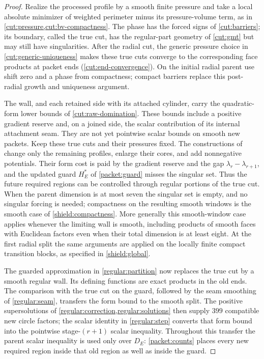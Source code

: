 \documentclass[11pt]{article}
\numberwithin{equation}{section}
\theoremstyle{definition}
\theoremstyle{remark}
\begin{document}
\begin{proof}
Realize the processed profile by a smooth finite pressure and take a
local absolute minimizer of weighted perimeter minus its pressure-volume
term, as in \cref{cut:pressure,cut:bv-compactness}. The phase has the
forced signs of \cref{cut:barriers}; its boundary, called the true cut,
has the regular-part geometry of \cref{cut:gmt} but may still have
singularities. After the
radial cut, the generic pressure choice in
\cref{cut:generic-uniqueness} makes these true cuts converge to the
corresponding face products at packet ends
(\cref{cut:end-convergence}). On the initial radial parent use shift
zero and a phase from compactness; compact barriers replace this
post-radial growth and uniqueness argument.

The wall, and each retained side with its attached cylinder,
carry the quadratic-form lower bounds of \cref{cut:raw-domination}.
These bounds include a positive gradient reserve and, on a joined
side, the scalar contribution of its internal attachment seam.
They are not yet pointwise scalar bounds on smooth new packets.
Keep these true cuts and their pressures fixed. The constructions of
 change only the remaining
profiles, enlarge their cores, and add nonnegative potentials. Their
form cost is paid by the gradient reserve and the gap
$\lambda_r-\lambda_{r+1}$, and the updated guard $H_E^*$ of
\eqref{packet:guard} misses the singular set. Thus the future required
regions can be controlled through regular portions of the true cut.
When the parent dimension is at most seven the
singular set is empty, and no singular forcing is needed; compactness on
the resulting smooth windows is the smooth case of
\cref{shield:compactness}. More generally this smooth-window case applies
whenever the limiting wall is smooth, including products of smooth faces
with Euclidean factors even when their total dimension is at least eight.
At the first radial split the same arguments
are applied on the locally finite compact transition blocks, as specified
in \cref{shield:global}.

The guarded approximation in \cref{regular:partition} now replaces
the true cut by a smooth regular wall. Its defining functions are
exact products in the old ends. The comparison with the true cut on
the guard, followed by the seam smoothing of \cref{regular:seam},
transfers the form bound to the smooth split. The positive
supersolutions of \cref{regular:correction,regular:solutions}
then supply $399$ compatible new circle factors; the scalar identity
in \cref{regular:step} converts that form bound into the pointwise
stage-$(r+1)$ scalar inequality. Throughout this transfer the parent
scalar inequality is used only over $D_E$: \cref{packet:counts}
places every new required region inside that old region as well as
inside the guard.


\end{proof}
\end{document}
